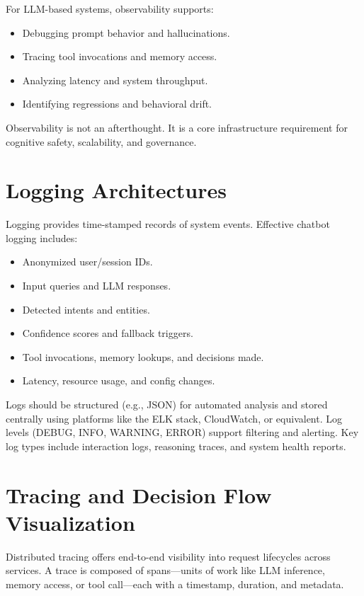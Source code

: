 \documentclass{book}
\begin{document}
For LLM-based systems, observability supports:

\begin{itemize}
  \item Debugging prompt behavior and hallucinations.
  \item Tracing tool invocations and memory access.
  \item Analyzing latency and system throughput.
  \item Identifying regressions and behavioral drift.
\end{itemize}

Observability is not an afterthought. It is a core infrastructure requirement for cognitive safety, scalability, and governance.

\section{Logging Architectures}

Logging provides time-stamped records of system events. Effective chatbot logging includes:

\begin{itemize}
  \item Anonymized user/session IDs.
  \item Input queries and LLM responses.
  \item Detected intents and entities.
  \item Confidence scores and fallback triggers.
  \item Tool invocations, memory lookups, and decisions made.
  \item Latency, resource usage, and config changes.
\end{itemize}

Logs should be structured (e.g., JSON) for automated analysis and stored centrally using platforms like the ELK stack, CloudWatch, or equivalent. Log levels (DEBUG, INFO, WARNING, ERROR) support filtering and alerting. Key log types include interaction logs, reasoning traces, and system health reports.

\section{Tracing and Decision Flow Visualization}

Distributed tracing offers end-to-end visibility into request lifecycles across services. A trace is composed of spans—units of work like LLM inference, memory access, or tool call—each with a timestamp, duration, and metadata.
\end{document}
